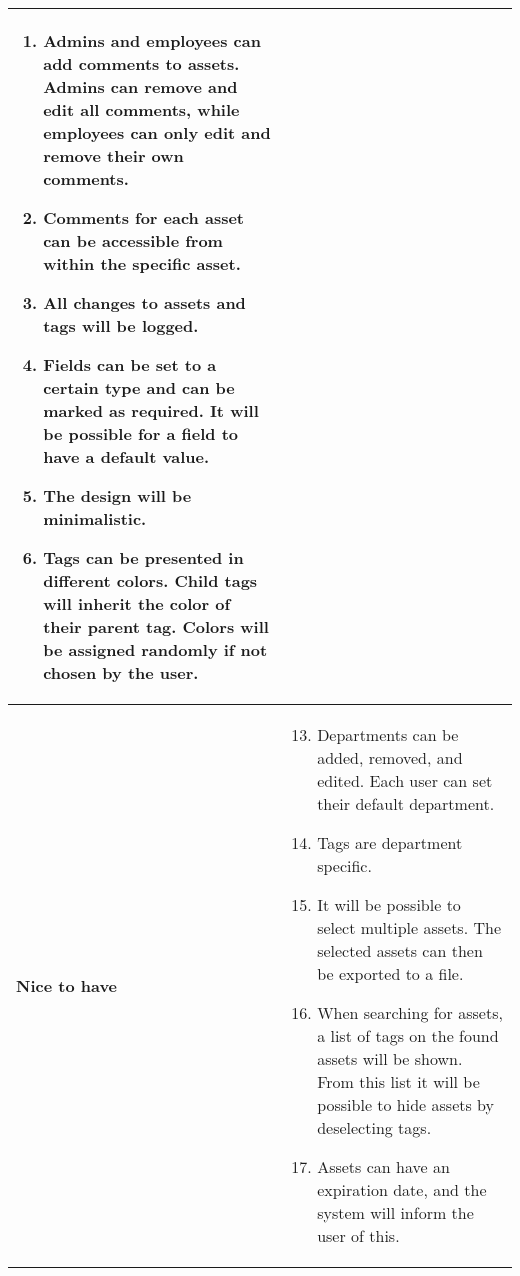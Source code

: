\begin{longtable}{p{3.2cm} p{10cm}}
\begin{enumerate}
            \item Admins and employees can add comments to assets. Admins can remove and edit all comments, while employees can only edit and remove their own comments.
            
            \item Comments for each asset can be accessible from within the specific asset.
            
            \item All changes to assets and tags will be logged.
            
            \item Fields can be set to a certain type and can be marked as required. It will be possible for a field to have a default value.
            
            \item The design will be minimalistic.
            
            \item Tags can be presented in different colors. Child tags will inherit the color of their parent tag. Colors will be assigned randomly if not chosen by the user.
            
        \end{enumerate}
        \\
        \hline
        
        \textbf{Nice to have} &     
        \vspace*{-7mm}
        \begin{enumerate} \setcounter{enumi}{12} \itemsep0em 
        
            \item Departments can be added, removed, and edited. Each user can set their default department.
            
            \item Tags are department specific.
            
            \item It will be possible to select multiple assets. The selected assets can then be exported to a file.
            
            \item When searching for assets, a list of tags on the found assets will be shown. From this list it will be possible to hide assets by deselecting tags.
            
            \item Assets can have an expiration date, and the system will inform the user of this.
            

\end{enumerate}
\end{longtable}
